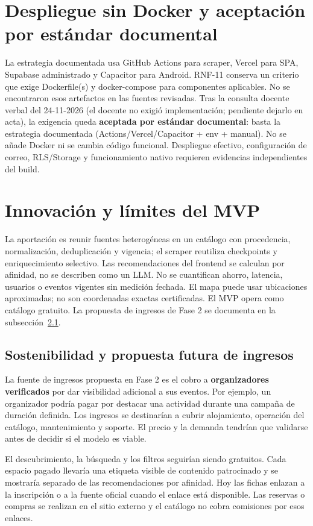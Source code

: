 \section{Despliegue sin Docker y aceptación por estándar documental}
\label{sec:docker}
La estrategia documentada usa GitHub Actions para scraper, Vercel para SPA,
Supabase administrado y Capacitor para Android. RNF-11 conserva un criterio que exige
Dockerfile(s) y docker-compose para componentes aplicables. No se encontraron esos
artefactos en las fuentes revisadas. Tras la consulta docente verbal del 24-11-2026
(el docente no exigió implementación; pendiente dejarlo en acta), la exigencia queda
\textbf{aceptada por estándar documental}: basta la estrategia documentada
(Actions/Vercel/Capacitor + env + manual). No se añade Docker ni se cambia código funcional.
Despliegue efectivo, configuración de correo, RLS/Storage y funcionamiento nativo
requieren evidencias independientes del build.

\section{Innovación y límites del MVP}
\label{sec:innovacion}
La aportación es reunir fuentes heterogéneas en un catálogo con procedencia, normalización,
deduplicación y vigencia; el scraper reutiliza checkpoints y enriquecimiento selectivo.
Las recomendaciones del frontend se calculan por afinidad, no se describen como un LLM.
No se cuantifican ahorro, latencia, usuarios o eventos vigentes sin medición fechada.
El mapa puede usar ubicaciones aproximadas; no son coordenadas exactas certificadas.
El MVP opera como catálogo gratuito. La propuesta de ingresos de Fase 2 se
documenta en la subsección~\ref{subsec:modelo-negocio}.

\subsection{Sostenibilidad y propuesta futura de ingresos}
\label{subsec:modelo-negocio}

La fuente de ingresos propuesta en Fase 2 es el cobro a \textbf{organizadores
verificados} por dar visibilidad adicional a sus eventos. Por ejemplo, un
organizador podría pagar por destacar una actividad durante una campaña de
duración definida. Los ingresos se destinarían a cubrir alojamiento, operación
del catálogo, mantenimiento y soporte. El precio y la demanda tendrían que
validarse antes de decidir si el modelo es viable.

El descubrimiento, la búsqueda y los filtros seguirían siendo gratuitos. Cada
espacio pagado llevaría una etiqueta visible de contenido patrocinado y se
mostraría separado de las recomendaciones por afinidad. Hoy las fichas enlazan a
la inscripción o a la fuente oficial cuando el enlace está disponible. Las
reservas o compras se realizan en el sitio externo y el catálogo no cobra
comisiones por esos enlaces.


